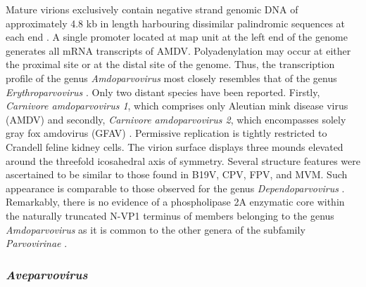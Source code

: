 Mature virions exclusively contain negative strand genomic DNA of approximately 4.8 kb in length harbouring dissimilar palindromic sequences at each end \cite{pmid6252342, pmid2843669}. A single promoter located at map unit at the left end of the genome generates all mRNA transcripts of AMDV.  Polyadenylation may occur at either the proximal site or at the distal site of the genome. Thus, the transcription profile of the genus \textit{Amdoparvovirus} most closely resembles  that of the genus \textit{Erythroparvovirus} \cite{pmid16378968}.  
Only two distant species have been reported. Firstly, \textit{Carnivore amdoparvovirus 1}, which comprises only Aleutian mink disease virus (AMDV) and secondly, \textit{Carnivore amdoparvovirus 2}, which encompasses solely gray fox amdovirus (GFAV) \cite{pmid22000359}. 
Permissive replication is tightly restricted to Crandell feline kidney cells. The virion surface displays three mounds elevated around the threefold icosahedral axis of symmetry. Several structure features were ascertained to be similar to those found in B19V, CPV, FPV, and MVM. Such appearance is comparable to those observed for the genus \textit{Dependoparvovirus} \cite{pmid10400786}. Remarkably, there is no evidence of a phospholipase 2A enzymatic core within the naturally truncated N-VP1 terminus of members belonging to the genus \textit{Amdoparvovirus} as it is common to the other genera of the subfamily \textit{Parvovirinae} \cite{icvt}. 



\subsubsection{\textit{Aveparvovirus}}

